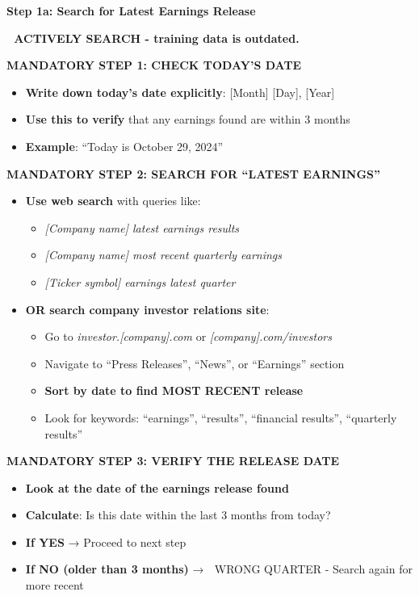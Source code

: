 \documentclass[11pt]{article}
\begin{document}
\textbf{Step 1a: Search for Latest Earnings Release}


\textbf{🚨 ACTIVELY SEARCH - training data is outdated. 🚨}


\textbf{MANDATORY STEP 1: CHECK TODAY'S DATE}

\begin{itemize}[leftmargin=*,itemsep=2pt,topsep=2pt]
\item {} \textbf{Write down today's date explicitly}: [Month] [Day], [Year]
\item {} \textbf{Use this to verify} that any earnings found are within 3 months
\item {} \textbf{Example}: ``Today is October 29, 2024''
\end{itemize}

\textbf{MANDATORY STEP 2: SEARCH FOR ``LATEST EARNINGS''}

\begin{itemize}[leftmargin=*,itemsep=2pt,topsep=2pt]
\item {} \textbf{Use web search} with queries like:
\begin{itemize}[leftmargin=*,itemsep=2pt,topsep=2pt]
\item {} \emph{[Company name] latest earnings results}
\item {} \emph{[Company name] most recent quarterly earnings}
\item {} \emph{[Ticker symbol] earnings latest quarter}
\end{itemize}
\item {} \textbf{OR search company investor relations site}:
\begin{itemize}[leftmargin=*,itemsep=2pt,topsep=2pt]
\item {} Go to \emph{investor.[company].com} or \emph{[company].com/investors}
\item {} Navigate to ``Press Releases'', ``News'', or ``Earnings'' section
\item {} \textbf{Sort by date to find MOST RECENT release}
\item {} Look for keywords: ``earnings'', ``results'', ``financial results'', ``quarterly results''
\end{itemize}
\end{itemize}

\textbf{MANDATORY STEP 3: VERIFY THE RELEASE DATE}

\begin{itemize}[leftmargin=*,itemsep=2pt,topsep=2pt]
\item {} \textbf{Look at the date of the earnings release found}
\item {} \textbf{Calculate}: Is this date within the last 3 months from today?
\item {} \textbf{If YES} → Proceed to next step
\item {} \textbf{If NO (older than 3 months)} → 🚨 WRONG QUARTER - Search again for more recent
\end{itemize}
\end{document}
